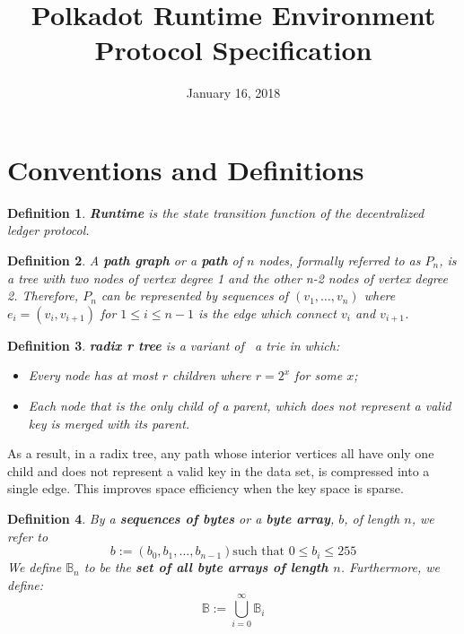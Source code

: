 \documentclass{article}
\newcommand{\assign}{:=}
\newcommand{\tmstrong}[1]{\textbf{#1}}
\newcommand{\tmtextbf}[1]{{\bfseries{#1}}}
\newcommand{\tmtexttt}[1]{{\ttfamily{#1}}}
\newcommand{\tmverbatim}[1]{{\ttfamily{#1}}}
\newtheorem{definition}{Definition}
\providecommand{\tmstrong}[1]{\tmtextbf{#1}}
\providecommand{\tmtextbf}[1]{\tmtextbf{#1}}
\providecommand{\tmverbatim}[1]{\tmtexttt{#1}}
\newtheorem{definition}{Definition}
\begin{document}
\title{
  Polkadot Runtime Environment\\
  {\Large Protocol Specification}
}

\date{January 16, 2018}

\maketitle

\section{Conventions and Definitions}

\begin{definition}
  {\tmstrong{Runtime}} is the state transition function of the decentralized
  ledger protocol.\tmverbatim{}
\end{definition}

\begin{definition}
  \label{def-path-graph}A {\tmstrong{path graph}} or a {\tmstrong{path}} of
  $n$ nodes, formally referred to as {\tmstrong{$P_n$}}, is a tree with two
  nodes of vertex degree 1 and the other n-2 nodes of vertex degree 2.
  Therefore, $P_n$ can be represented by sequences of $(v_1, \ldots, v_n)$
  where $e_i = (v_i, v_{i + 1})$ for $1 \leqslant i \leqslant n - 1$ is the
  edge which connect $v_i$ and $v_{i + 1}$.
\end{definition}

\begin{definition}
  \label{def-radix-tree}{\tmstrong{radix r tree}} is a variant of \ a trie in
  which:
  \begin{itemize}
    \item Every node has at most $r$ children where $r = 2^x$ for some $x$;
    
    \item Each node that is the only child of a parent, which does not
    represent a valid key is merged with its parent.
  \end{itemize}
\end{definition}

As a result, in a radix tree, any path whose interior vertices all have only
one child and does not represent a valid key in the data set, is compressed
into a single edge. This improves space efficiency when the key space is
sparse.

\begin{definition}
  By a {\tmstrong{sequences of bytes}} or a {\tmstrong{byte array}}, $b$, of
  length $n$, we refer to
  \[ b \assign (b_0, b_1, ..., b_{n - 1})  \text{such that } 0 \leqslant b_i
     \leqslant 255 \]
  We define $\mathbb{B}_n$ to be the {\tmstrong{set of all byte arrays of
  length $n$}}. Furthermore, we define:
  \[ \mathbb{B} \assign \bigcup^{\infty}_{i = 0} \mathbb{B}_i \]
\end{definition}
\end{document}

